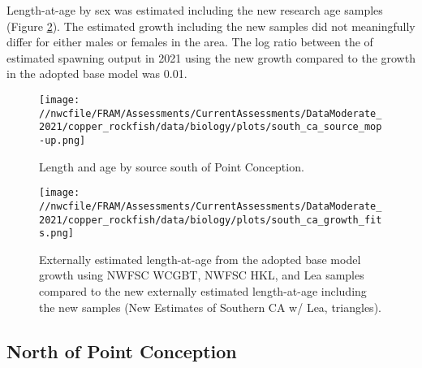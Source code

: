 \documentclass[11pt,
  english,
  a4paper,
]{article}
\begin{document}

Length-at-age by sex was estimated including the new research age samples (Figure \ref{fig:south-growth-est}). The estimated growth including the new samples did not meaningfully differ for either males or females in the area. The log ratio between the of estimated spawning output in 2021 using the new growth compared to the growth in the adopted base model was 0.01.

\leavevmode\tagmcend\tagstructend\par


\begin{figure}
\centering
\texttt{[image: //nwcfile/FRAM/Assessments/CurrentAssessments/DataModerate\_2021/copper\_rockfish/data/biology/plots/south\_ca\_source\_mop-up.png]}
\caption{Length and age by source south of Point Conception.\label{fig:south-samples}}
\end{figure}

\tagmcend\tagstructend


\begin{figure}
\centering
\texttt{[image: //nwcfile/FRAM/Assessments/CurrentAssessments/DataModerate\_2021/copper\_rockfish/data/biology/plots/south\_ca\_growth\_fits.png]}
\caption{Externally estimated length-at-age from the adopted base model growth using NWFSC WCGBT, NWFSC HKL, and Lea samples compared to the new externally estimated length-at-age including the new samples (New Estimates of Southern CA w/ Lea, triangles).\label{fig:south-growth-est}}
\end{figure}

\tagmcend\tagstructend

\clearpage


\hypertarget{north-of-point-conception}{%
\subsection{North of Point Conception}\label{north-of-point-conception}}

\leavevmode\tagmcend\tagstructend

\end{document}
